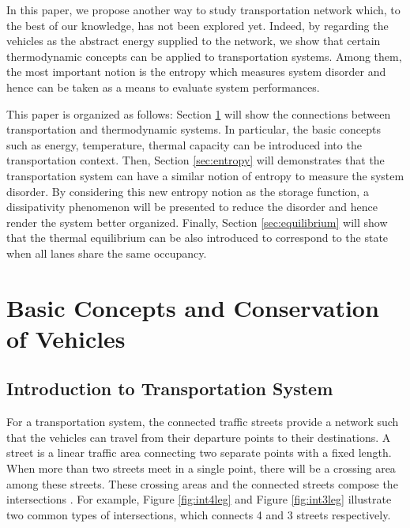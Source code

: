 \documentclass[preprint,authoryear,12pt]{elsarticle}
\begin{document}
In this paper, we propose another way to study transportation network
which, to the best of our knowledge,  has not been explored yet.
Indeed, by regarding the vehicles as the abstract energy supplied to
the network, we show that certain thermodynamic concepts can be
applied to transportation systems. Among them, the most important
notion is the entropy which measures system disorder and hence can be
taken as a means to evaluate system performances.

This paper is organized as follows: Section \ref{sec:concepts} will
show the connections between transportation and thermodynamic
systems. In particular, the basic concepts such as energy,
temperature, thermal capacity can be introduced into the
transportation context. Then, Section \ref{sec:entropy} will
demonstrates that the transportation system can have a similar notion
of entropy to measure the system disorder. By considering this new
entropy notion as the storage function, a dissipativity phenomenon
will be presented to reduce the disorder and hence render the system
better organized. Finally, Section \ref{sec:equilibrium} will show
that the thermal equilibrium can be also introduced to correspond to
the state when all lanes share the same occupancy.

\section{Basic Concepts and Conservation of Vehicles}\label{sec:concepts}

\subsection{Introduction to Transportation System}

For a transportation system, the connected traffic streets provide a
network such that the vehicles can travel from their departure points
to their destinations. A street is a linear traffic area connecting
two separate points with a fixed length. When more than two streets
meet in a single point, there will be a crossing area among these
streets. These crossing areas and the connected streets compose the
intersections \citep{papageorgiou_review_2003}. For example, Figure
\ref{fig:int4leg} and Figure \ref{fig:int3leg} illustrate two common
types of intersections, which connects 4 and 3 streets respectively.
\end{document}
